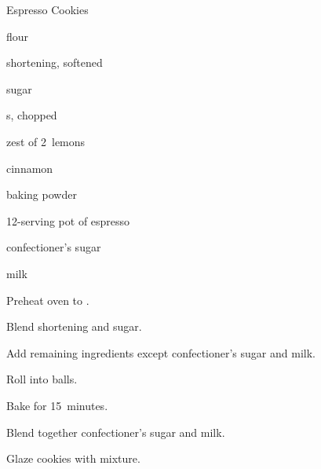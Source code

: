 \begin{recipe}{Espresso Cookies}{}{}

\begin{ingredients}
\item {} flour
\item {} shortening, softened
\item {} sugar
\item {} 
\item {} s, chopped
\item zest of 2~lemons
\item {} cinnamon
\item {} baking powder
\item 12-serving pot of espresso
\item confectioner's sugar
\item milk
\end{ingredients}

\begin{directions}
\item Preheat oven to .
\item Blend shortening and sugar.
\item Add remaining ingredients except confectioner's sugar and milk.
\item Roll into balls.
\item Bake for 15~minutes.
\item Blend together confectioner's sugar and milk.
\item Glaze cookies with mixture.
\end{directions}

\end{recipe}
